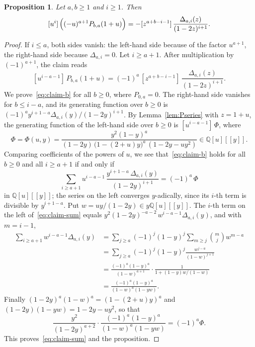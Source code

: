 \documentclass{amsart}
\newtheorem{proposition}[theorem]{Proposition}
\theoremstyle{definition}
\theoremstyle{remark}
\numberwithin{equation}{section}
\newcommand{\QQ}{\mathbb{Q}}
\newcommand{\cf}[1]{[#1]\,}
\begin{document}
\begin{proposition}\label{prop:correction}
Let $a,b\ge1$ and $i\ge1$. Then
\[
  \cf{u^i}\Bigl((-u)^{a+1}P_{b,a}(1+u)\Bigr)
  =-\cf{z^{a+b-i-1}}\frac{\Delta_{a,i}(z)}{(1-2z)^{i+1}}.
\]
\end{proposition}

\begin{proof}
If $i\le a$, both sides vanish: the left-hand side because of the factor
$u^{a+1}$, the right-hand side because $\Delta_{a,i}=0$. Let $i\ge a+1$. After
multiplication by $(-1)^{a+1}$, the claim reads
\begin{equation}\label{eq:claim-b}
  \cf{u^{i-a-1}}P_{b,a}(1+u)
  =(-1)^a\,\cf{z^{a+b-i-1}}\frac{\Delta_{a,i}(z)}{(1-2z)^{i+1}}.
\end{equation}
We prove~\eqref{eq:claim-b} for all $b\ge0$, where $P_{0,a}=0$. The right-hand side vanishes for
$b\le i-a$, and its generating function over $b\ge0$ is
$(-1)^ay^{i+1-a}\Delta_{a,i}(y)/(1-2y)^{i+1}$. By Lemma~\ref{lem:Pseries} with
$z=1+u$, the generating function of the left-hand side over $b\ge0$ is
$\cf{u^{i-a-1}}\Phi$, where
\[
  \Phi=\Phi(u,y)=\frac{y^2(1-y)^a}{(1-2y)\,\bigl(1-(2+u)y\bigr)^a\,(1-2y-uy^2)}
  \in\QQ[u][[y]].
\]
Comparing coefficients of the powers of $u$, we see that~\eqref{eq:claim-b}
holds for all $b\ge0$ and all $i\ge a+1$ if and only if
\begin{equation}\label{eq:claim-sum}
  \sum_{i\ge a+1}u^{i-a-1}\,\frac{y^{i+1-a}\,\Delta_{a,i}(y)}{(1-2y)^{i+1}}
  =(-1)^a\,\Phi
\end{equation}
in $\QQ[u][[y]]$; the series on the left converges $y$-adically, since its
$i$-th term is divisible by $y^{i+1-a}$. Put $w=uy/(1-2y)\in y\QQ[u][[y]]$. The
$i$-th term on the left of~\eqref{eq:claim-sum} equals
$y^2(1-2y)^{-a-2}\,w^{i-a-1}\Delta_{a,i}(y)$, and with $m=i-1$,
\begin{align*}
  \sum_{i\ge a+1}w^{i-a-1}\Delta_{a,i}(y)
  &=\sum_{j\ge a}(-1)^j(1-y)^j\sum_{m\ge j}\binom{m}{j}w^{m-a}\\
  &=\sum_{j\ge a}(-1)^j(1-y)^j\frac{w^{j-a}}{(1-w)^{j+1}}\\
  &=\frac{(-1)^a(1-y)^a}{(1-w)^{a+1}}\cdot\frac{1}{1+(1-y)w/(1-w)}\\
  &=\frac{(-1)^a(1-y)^a}{(1-w)^a(1-yw)}.
\end{align*}
Finally $(1-2y)^a(1-w)^a=(1-(2+u)y)^a$ and $(1-2y)(1-yw)=1-2y-uy^2$, so that
\[
  \frac{y^2}{(1-2y)^{a+2}}\cdot\frac{(-1)^a(1-y)^a}{(1-w)^a(1-yw)}=(-1)^a\Phi.
\]
This proves~\eqref{eq:claim-sum} and the proposition.
\end{proof}
\end{document}
